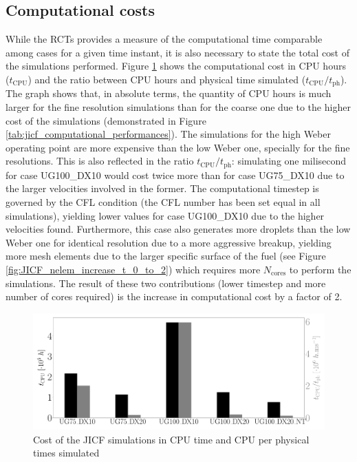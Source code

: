 \subsection{Computational costs}

While the RCTs provides a measure of the computational time comparable among cases for a given time instant, it is also necessary to state the total cost of the simulations performed. Figure \ref{fig:SLI_cost_convergence_all} shows the computational cost in CPU hours ($t_\mathrm{CPU}$) and the ratio between CPU hours and physical time simulated ($t_\mathrm{CPU}/t_\mathrm{ph}$). The graph shows that, in absolute terms, the quantity of CPU hours is much larger for the fine resolution simulations than for the coarse one due to the higher cost of the simulations (demonstrated in Figure \ref{tab:jicf_computational_performances}). The simulations for the high Weber operating point are more expensive than the low Weber one, specially for the fine resolutions. This is also reflected in the ratio $t_\mathrm{CPU}/t_\mathrm{ph}$: simulating one milisecond for case UG100\_DX10 would cost twice more than for case UG75\_DX10 due to the larger velocities involved in the former. The computational timestep is governed by the CFL condition (the CFL number has been set equal in all simulations), yielding lower values for case UG100\_DX10 due to the higher velocities found. Furthermore, this case also generates more droplets than the low Weber one for identical resolution due to a more aggressive breakup, yielding more mesh elements due to the larger specific surface of the fuel (see Figure \ref{fig:JICF_nelem_increase_t_0_to_2}) which requires more $N_\mathrm{cores}$ to perform the simulations. The result of these two contributions (lower timestep and more number of cores required) is the increase in computational cost by a factor of 2.

\begin{figure}[ht]
	\centering
   \includegraphics[scale=0.225]{./part2_developments/figures_ch5_resolved_JICF/SLI_cost_for_convergence/cost_all_simulations}
   \caption{Cost of the JICF simulations in CPU time and CPU per physical times simulated}
   \label{fig:SLI_cost_convergence_all}
\end{figure}

